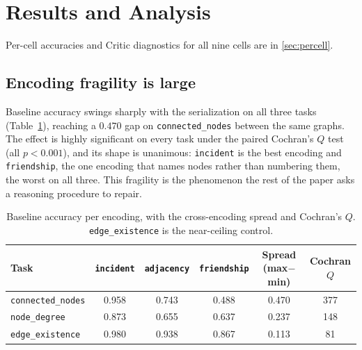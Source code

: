 \documentclass[11pt]{article}
\begin{document}
\section{Results and Analysis}
\label{sec:results}
Per-cell accuracies and Critic diagnostics for all nine cells are in
\ref{sec:percell}.

\subsection{Encoding fragility is large}
\label{sec:frag}
Baseline accuracy swings sharply with the serialization on all three tasks
(Table~\ref{tab:fragility}), reaching a $0.470$ gap on \texttt{connected\_nodes}
between the same graphs. The effect is highly significant on every task under the
paired Cochran's $Q$ test (all $p<0.001$), and its shape is unanimous:
\texttt{incident} is the best encoding and \texttt{friendship}, the one encoding
that names nodes rather than numbering them, the worst on all three. This fragility
is the phenomenon the rest of the paper asks a reasoning procedure to repair.

\begin{table}[t]
  \centering
  \small
  \begin{tabular}{@{}lccccc@{}}
    \toprule
    \textbf{Task} & \texttt{incident} & \texttt{adjacency} & \texttt{friendship} &
      \textbf{Spread (max$-$min)} & \textbf{Cochran $Q$} \\
    \midrule
    \texttt{connected\_nodes} & 0.958 & 0.743 & 0.488 & 0.470 & 377 \\
    \texttt{node\_degree}     & 0.873 & 0.655 & 0.637 & 0.237 & 148 \\
    \texttt{edge\_existence}  & 0.980 & 0.938 & 0.867 & 0.113 &  81 \\
    \bottomrule
  \end{tabular}
  \caption{Baseline accuracy per encoding, with the cross-encoding spread and
  Cochran's $Q$. \texttt{edge\_existence} is the near-ceiling control.}
  \label{tab:fragility}
\end{table}
\end{document}

